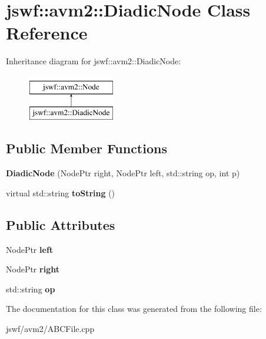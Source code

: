\hypertarget{classjswf_1_1avm2_1_1_diadic_node}{\section{jswf\+:\+:avm2\+:\+:Diadic\+Node Class Reference}
\label{classjswf_1_1avm2_1_1_diadic_node}
}
Inheritance diagram for jswf\+:\+:avm2\+:\+:Diadic\+Node\+:\begin{figure}[H]
\begin{center}
\leavevmode
\includegraphics[height=2.000000cm]{classjswf_1_1avm2_1_1_diadic_node}
\end{center}
\end{figure}
\subsection*{Public Member Functions}
\begin{DoxyCompactItemize}
\item 
\hypertarget{classjswf_1_1avm2_1_1_diadic_node_a7d56f48364ac32f14ae54f940d004bb1}{{\bfseries Diadic\+Node} (Node\+Ptr right, Node\+Ptr left, std\+::string op, int p)}\label{classjswf_1_1avm2_1_1_diadic_node_a7d56f48364ac32f14ae54f940d004bb1}

\item 
\hypertarget{classjswf_1_1avm2_1_1_diadic_node_accc74781dfc8979525e61dcc4dbbec8f}{virtual std\+::string {\bfseries to\+String} ()}\label{classjswf_1_1avm2_1_1_diadic_node_accc74781dfc8979525e61dcc4dbbec8f}

\end{DoxyCompactItemize}
\subsection*{Public Attributes}
\begin{DoxyCompactItemize}
\item 
\hypertarget{classjswf_1_1avm2_1_1_diadic_node_ab3afbf2c5500f1b10728554a23826386}{Node\+Ptr {\bfseries left}}\label{classjswf_1_1avm2_1_1_diadic_node_ab3afbf2c5500f1b10728554a23826386}

\item 
\hypertarget{classjswf_1_1avm2_1_1_diadic_node_a07c76949bba9ff36bfab1c22f9554fb2}{Node\+Ptr {\bfseries right}}\label{classjswf_1_1avm2_1_1_diadic_node_a07c76949bba9ff36bfab1c22f9554fb2}

\item 
\hypertarget{classjswf_1_1avm2_1_1_diadic_node_aa232f7856fb40e420e5d152618e1d27a}{std\+::string {\bfseries op}}\label{classjswf_1_1avm2_1_1_diadic_node_aa232f7856fb40e420e5d152618e1d27a}

\end{DoxyCompactItemize}


The documentation for this class was generated from the following file\+:\begin{DoxyCompactItemize}
\item 
jswf/avm2/A\+B\+C\+File.\+cpp\end{DoxyCompactItemize}

